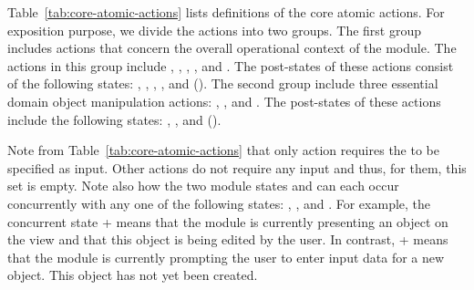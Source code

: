 %
Table~\ref{tab:core-atomic-actions} lists definitions of the core atomic actions. %
For exposition purpose, we divide the actions into two groups. %
The first group includes actions that concern the overall operational context of the module.
The actions in this group include , , , , and . The post-states of these actions consist of the following states: , , , , and  (\resp). 
%
The second group include three essential domain object manipulation actions: , , and . The post-states of these actions include the following states: , , and  (\resp).
%

Note from Table~\ref{tab:core-atomic-actions} that only action  requires the  to be specified as input. Other actions do not require any input and thus, for them, this set is empty. Note also how the two module states  and  can each occur concurrently with any one of the following states: , , and . For example, the concurrent state  +  means that the module is currently presenting an object on the view and that this object is being edited by the user. In contrast,  +  means that the module is currently prompting the user to enter input data for a new object. This object has not yet been created.
